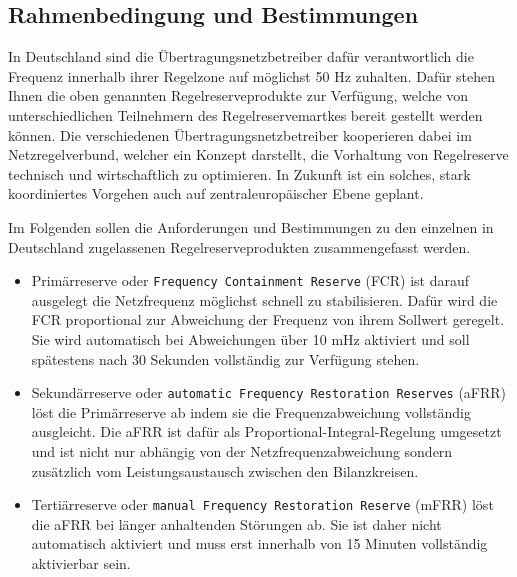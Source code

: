 \subsection{Rahmenbedingung und Bestimmungen}

In Deutschland sind die Übertragungsnetzbetreiber dafür verantwortlich die Frequenz innerhalb ihrer Regelzone auf möglichst
50 Hz zuhalten.
Dafür stehen Ihnen die oben genannten Regelreserveprodukte zur Verfügung, welche von unterschiedlichen Teilnehmern
des Regelreservemartkes bereit gestellt werden können.
Die verschiedenen Übertragungsnetzbetreiber kooperieren dabei im Netzregelverbund, welcher ein Konzept darstellt,
die Vorhaltung von Regelreserve technisch und wirtschaftlich zu optimieren.
In Zukunft ist ein solches, stark koordiniertes Vorgehen auch auf zentraleuropäischer Ebene geplant.

Im Folgenden sollen die Anforderungen und Bestimmungen zu den einzelnen in Deutschland zugelassenen Regelreserveprodukten 
zusammengefasst werden.

\begin{itemize}
    \item Primärreserve oder \texttt{Frequency Containment Reserve} (FCR) ist darauf ausgelegt die Netzfrequenz möglichst schnell zu stabilisieren. Dafür wird die FCR proportional zur Abweichung der Frequenz von ihrem Sollwert geregelt. Sie wird automatisch bei Abweichungen über 10 mHz aktiviert und soll spätestens nach 30 Sekunden vollständig zur Verfügung stehen.
    \item Sekundärreserve oder \texttt{automatic Frequency Restoration Reserves} (aFRR) löst die Primärreserve ab indem sie die Frequenzabweichung vollständig ausgleicht. Die aFRR ist dafür als Proportional-Integral-Regelung umgesetzt und ist nicht nur abhängig von der Netzfrequenzabweichung sondern zusätzlich vom Leistungsaustausch zwischen den Bilanzkreisen.
    \item Tertiärreserve oder \texttt{manual Frequency Restoration Reserve} (mFRR) löst die aFRR bei länger anhaltenden Störungen ab. Sie ist daher nicht automatisch aktiviert und muss erst innerhalb von 15 Minuten vollständig aktivierbar sein.
\end{itemize}

